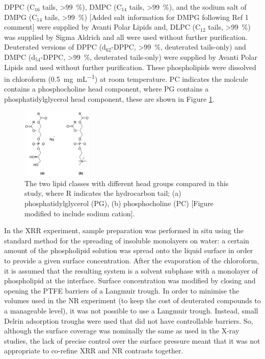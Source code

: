 \documentclass[amsmath,amssymb,twocolumn,superscriptaddress]{revtex4-1}
\begin{document}
DPPC (C$_{16}$ tails, \SI{>99}{\percent}), DMPC (C$_{14}$ tails, \SI{>99}{\percent}), and the sodium salt of DMPG (C$_{14}$ tails, \SI{>99}{\percent}) [Added salt information for DMPG following Ref 1 comment] were supplied by Avanti Polar Lipids and, DLPC (C$_{12}$ tails, \SI{>99}{\percent}) was supplied by Sigma Aldrich and all were used without further purification.
Deuterated versions of DPPC (d$_{62}$-DPPC, \SI{>99}{\percent}, deuterated tails-only) and DMPC (d$_{54}$-DPPC, \SI{>99}{\percent}, deuterated tails-only) were supplied by Avanti Polar Lipids and used without further purification.
These phospholipids were dissolved in chloroform (\SI{0.5}{\milli\gram\per\milli\liter}) at room temperature.
PC indicates the molcule contains a phosphocholine head component, where PG contains a phosphatidylglycerol head component, these are shown in Figure \ref{fig:heads}.
%
\begin{figure}
\includegraphics[width=0.3\textwidth]{figures/head_groups}
\caption{\label{fig:heads}\small The two lipid classes with different head
groups compared in this study, where R indicates the hydrocarbon tail;
(a) phosphatidylglycerol (PG), (b) phosphocholine (PC) [Figure modified to include sodium cation].}
\end{figure}
%

In the XRR experiment, sample preparation was performed in situ using the standard method for the spreading of insoluble monolayers on water: a certain amount of the phospholipid solution was spread onto the liquid surface in order to provide a given surface concentration.
After the evaporation of the chloroform, it is assumed that the resulting system is a solvent subphase with a monolayer of phospholipid at the interface.
Surface concentration was modified by closing and opening the PTFE barriers of a Langmuir trough.
In order to minimise the volumes used in the NR experiment (to keep the cost of deuterated compounds to a manageable level), it was not possible to use a Langmuir trough.
Instead, small Delrin adsorption troughs were used that did not have controllable barriers.
So, although the surface coverage was nominally the same as used in the X-ray studies, the lack of precise control over the surface pressure meant that it was not appropriate to co-refine XRR and NR contrasts together.
\end{document}
